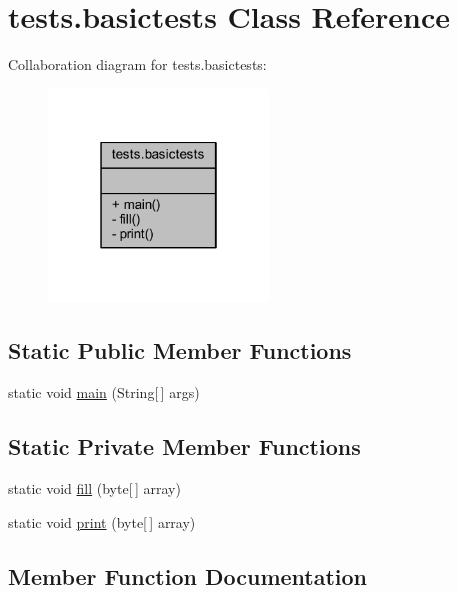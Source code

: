 \hypertarget{classtests_1_1basictests}{}\section{tests.\+basictests Class Reference}
\label{classtests_1_1basictests}


Collaboration diagram for tests.\+basictests\+:\nopagebreak
\begin{figure}[H]
\begin{center}
\leavevmode
\includegraphics[width=166pt]{classtests_1_1basictests__coll__graph}
\end{center}
\end{figure}
\subsection*{Static Public Member Functions}
\begin{DoxyCompactItemize}
\item 
static void \mbox{\hyperlink{classtests_1_1basictests_a8c2ad51be644e7e21d5d8fb8b78e8333}{main}} (String\mbox{[}$\,$\mbox{]} args)
\end{DoxyCompactItemize}
\subsection*{Static Private Member Functions}
\begin{DoxyCompactItemize}
\item 
static void \mbox{\hyperlink{classtests_1_1basictests_aa076603ce6afff4a730fadcb1522855a}{fill}} (byte\mbox{[}$\,$\mbox{]} array)
\item 
static void \mbox{\hyperlink{classtests_1_1basictests_a99ff70815545eb9d06d865a4b64f7e8d}{print}} (byte\mbox{[}$\,$\mbox{]} array)
\end{DoxyCompactItemize}


\subsection{Member Function Documentation}
\mbox{\label{classtests_1_1basictests_aa076603ce6afff4a730fadcb1522855a}} 
